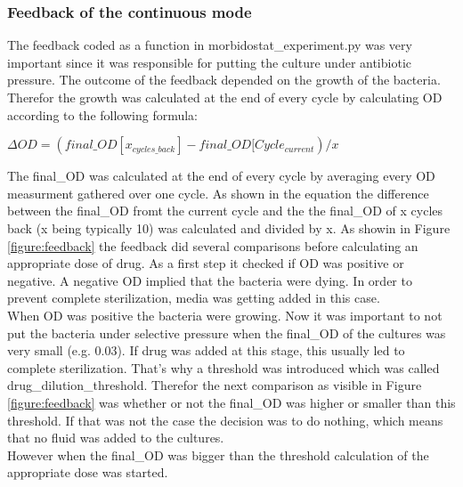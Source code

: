 \subsubsection{Feedback of the continuous mode} 
The feedback coded as a function in morbidostat\_experiment.py was very important since it was responsible for putting the culture under antibiotic pressure. The outcome of the feedback depended on the growth of the bacteria. Therefor the growth was calculated at the end of every cycle by calculating \textDelta OD according to the following formula:
\begin{center}
	$\Delta OD = (final\_OD[x_{cycles\_back}] - final\_OD[Cycle_{current})/x$
\end{center}
The final\_OD was calculated at the end of every cycle by averaging every OD measurment gathered over one cycle. As shown in the equation the difference between the final\_OD fromt the current cycle and the the final\_OD of x cycles back (x being typically 10) was calculated and divided by x.
As showin in Figure \ref{figure:feedback} the feedback did several comparisons before calculating an appropriate dose of drug. As a first step it checked if \textDelta OD was positive or negative. A negative \textDelta OD implied that the bacteria were dying. In order to prevent complete sterilization, media was getting added in this case. \\
When \textDelta OD was positive the bacteria were growing. Now it was important to not put the bacteria under selective pressure when the final\_OD of the cultures was very small (e.g. 0.03). If drug was added at this stage, this usually led to complete sterilization. That's why a threshold was introduced which was called drug\_dilution\_threshold. Therefor the next comparison as visible in Figure \ref{figure:feedback} was whether or not the final\_OD was higher or smaller than this threshold. If that was not the case the decision was to do nothing, which means that no fluid was added to the cultures. \\
However when the final\_OD was bigger than the threshold calculation of the appropriate dose was started.
